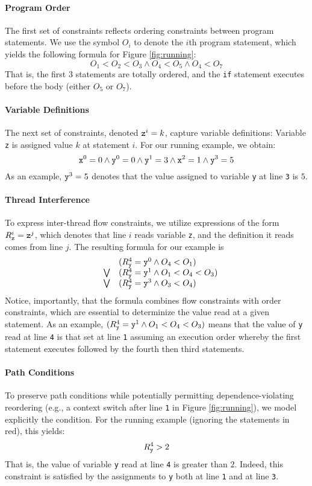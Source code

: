 \paragraph{Program Order} The first set of constraints reflects ordering constraints between program statements. We use the symbol $O_i$ to denote the $i$th program statement, which yields the following formula for Figure \ref{fig:running}:
$$
	O_1 < O_2 < O_3 \wedge O_4 < O_5 \wedge O_4 < O_7
$$
That is, the first 3 statements are totally ordered, and the {\tt if} statement executes before the body (either $O_5$ or $O_7$).

\paragraph{Variable Definitions} The next set of constraints, denoted ${\tt z}^i=k$, capture variable definitions: Variable {\tt z} is assigned value $k$ at statement $i$. For our running example, we obtain:
$$
	{\tt x}^0 = 0 \wedge {\tt y}^0 = 0 \wedge {\tt y}^1 = 3 \wedge 
			{\tt x}^2 = 1 \wedge {\tt y}^3 = 5
$$
As an example, ${\tt y}^3 = 5$ denotes that the value assigned to variable {\tt y} 
at line {\tt 3} is $5$.

\paragraph{Thread Interference} To express inter-thread flow constraints, we utilize expressions of the form $R_{\tt z}^i={\tt z}^j$, which denotes that line $i$ reads variable {\tt z}, and the definition it reads comes from line $j$. The resulting formula for our example is
$$
\begin{array}{lcl}
	& & (R_{\tt y}^4={\tt y}^0 \wedge O_4 < O_1)  \\
& \bigvee &
	(R_{\tt y}^4={\tt y}^1 \wedge O_1 < O_4 < O_3) \\
& \bigvee &
	(R_{\tt y}^4={\tt y}^3 \wedge O_3 < O_4)
\end{array}
$$    
Notice, importantly, that the formula combines flow constraints with order constraints, which are essential to determinize the value read at a given statement. As an example, 
$(R_{\tt y}^4={\tt y}^1 \wedge O_1 < O_4 < O_3)$ means that the value of {\tt y} read at 
line {\tt 4} is that set at line {\tt 1} assuming an execution order whereby the first statement executes followed by the fourth then third statements. 

\paragraph{Path Conditions} To preserve path conditions while potentially permitting dependence-violating reordering (e.g., a context switch after line {\tt 1} in Figure \ref{fig:running}), we model explicitly the condition. For the running example (ignoring the statements in red), this yields:
$$
	R_{\tt y}^4 > 2
$$
That is, the value of variable {\tt y} read at line {\tt 4} is greater than $2$. Indeed, this constraint is satisfied by the assignments to {\tt y} both at line {\tt 1} and at line {\tt 3}.

